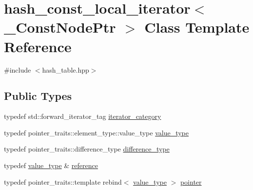 \hypertarget{classhash__const__local__iterator}{}\section{hash\+\_\+const\+\_\+local\+\_\+iterator$<$ \+\_\+\+Const\+Node\+Ptr $>$ Class Template Reference}
\label{classhash__const__local__iterator}


{\ttfamily \#include $<$hash\+\_\+table.\+hpp$>$}

\subsection*{Public Types}
\begin{DoxyCompactItemize}
\item 
typedef std\+::forward\+\_\+iterator\+\_\+tag \hyperlink{classhash__const__local__iterator_aec8b54be78028f13749b7a12c2e3b5a2}{iterator\+\_\+category}
\item 
typedef pointer\+\_\+traits\+::element\+\_\+type\+::value\+\_\+type \hyperlink{classhash__const__local__iterator_af8701342a208f3b71712270ece9e7572}{value\+\_\+type}
\item 
typedef pointer\+\_\+traits\+::difference\+\_\+type \hyperlink{classhash__const__local__iterator_aeb5f0926216599a01a0df40329208f91}{difference\+\_\+type}
\item 
typedef \hyperlink{classhash__const__local__iterator_af8701342a208f3b71712270ece9e7572}{value\+\_\+type} \& \hyperlink{classhash__const__local__iterator_a651a8f3ade8e5024bc7819582c854f83}{reference}
\item 
typedef pointer\+\_\+traits\+::template rebind$<$ \hyperlink{classhash__const__local__iterator_af8701342a208f3b71712270ece9e7572}{value\+\_\+type} $>$ \hyperlink{classhash__const__local__iterator_acfcca3eb814a6062a2f3cdb62ebc94e4}{pointer}
\end{DoxyCompactItemize}
